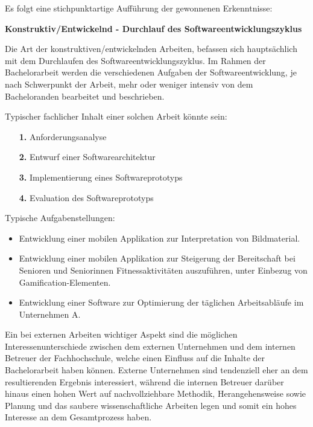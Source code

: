 \documentclass[bibliography=totoc,listof=totoc,BCOR=5mm,DIV=12,oneside]{scrbook}
\begin{document}
\par\medskip Es folgt eine stichpunktartige Aufführung der gewonnenen Erkenntnisse:


\par \bigskip \textbf{Konstruktiv/Entwickelnd - Durchlauf des Softwareentwicklungszyklus}
\par \medskip Die Art der konstruktiven/entwickelnden Arbeiten, befassen sich hauptsächlich mit dem Durchlaufen des Softwareentwicklungszyklus. Im Rahmen der Bachelorarbeit werden die verschiedenen Aufgaben der Softwareentwicklung, je nach Schwerpunkt der Arbeit, mehr oder weniger intensiv von dem Bacheloranden bearbeitet und beschrieben.
\par \medskip Typischer fachlicher Inhalt einer solchen Arbeit könnte sein:
\begin{itemize}
\item[\textbf{1.}] Anforderungsanalyse
\item[\textbf{2.}] Entwurf einer Softwarearchitektur
\item[\textbf{3.}] Implementierung eines Softwareprototyps
\item[\textbf{4.}] Evaluation des Softwareprototyps
\end{itemize}

\par \medskip Typische Aufgabenstellungen:
\begin{itemize}
\item Entwicklung einer mobilen Applikation zur Interpretation von Bildmaterial.
\item Entwicklung einer mobilen Applikation zur Steigerung der Bereitschaft bei Senioren und Seniorinnen Fitnessaktivitäten auszuführen, unter Einbezug von  Gamification-Elementen.
\item Entwicklung einer Software zur Optimierung der täglichen Arbeitsabläufe im Unternehmen A.
\end{itemize}

\par \medskip Ein bei externen Arbeiten wichtiger Aspekt sind die möglichen Interessenunterschiede zwischen dem externen Unternehmen und dem internen Betreuer der Fachhochschule, welche einen Einfluss auf die Inhalte der Bachelorarbeit haben können. Externe Unternehmen sind tendenziell eher an dem resultierenden Ergebnis interessiert, während die internen Betreuer darüber hinaus einen hohen Wert auf nachvollziehbare Methodik, Herangehensweise sowie Planung und das saubere wissenschaftliche Arbeiten legen und somit ein  hohes Interesse an dem Gesamtprozess haben.
\end{document}
